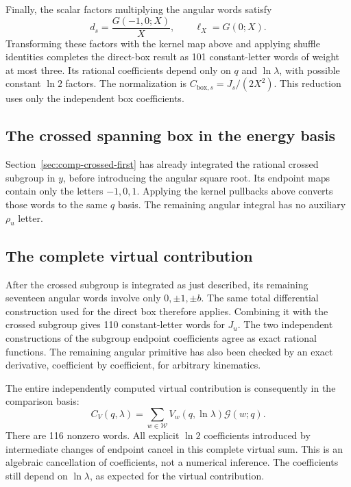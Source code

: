 Finally, the scalar factors multiplying the angular words satisfy
\begin{equation}
 d_s=\frac{G(-1,0;X)}{X},\qquad \ell_X=G(0;X).
\end{equation}
Transforming these factors with the kernel map above and applying
shuffle identities completes the direct-box result as 101 constant-letter
words of weight at most three.  Its rational coefficients depend only
on $q$ and $\ln\lambda$, with possible constant $\ln2$ factors.  The
normalization is $C_{\mathrm{box},s}=J_s/(2X^2)$.
This reduction uses only the independent box coefficients.

\subsection{The crossed spanning box in the energy basis}
Section~\ref{sec:comp-crossed-first} has already integrated the rational
crossed subgroup in $y$, before introducing the angular square root.
Its endpoint maps contain only the letters $-1,0,1$. Applying the
kernel pullbacks above converts those words to the same $q$ basis.
The remaining angular integral has no auxiliary $\rho_u$ letter.

\subsection{The complete virtual contribution}
After the crossed subgroup is integrated as just described, its remaining
seventeen angular words involve only $0,\pm1,\pm b$.  The same total
differential construction used for the direct box therefore applies.
Combining it with the crossed subgroup gives 110 constant-letter words
for $J_u$.  The two independent constructions of the subgroup endpoint
coefficients agree as exact rational functions.  The remaining angular
primitive has also been checked by an exact derivative, coefficient by
coefficient, for arbitrary kinematics.

The entire independently computed virtual contribution is consequently
in the comparison basis:
\begin{equation}
 C_V(q,\lambda)=\sum_{w\in\mathcal W}V_w(q,\ln\lambda)\mathcal G(w;q).
\end{equation}
There are 116 nonzero words.  All explicit $\ln2$ coefficients introduced
by intermediate changes of endpoint cancel in this complete virtual
sum.  This is an algebraic cancellation of coefficients, not a numerical
inference.  The coefficients still depend on $\ln\lambda$, as expected
for the virtual contribution.


